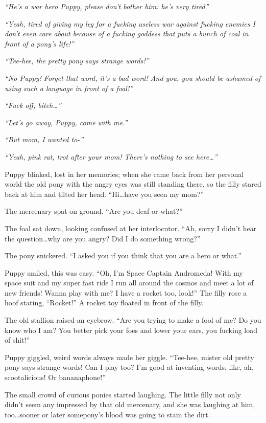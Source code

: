 \emph{``He's a war hero Puppy, please don't bother him: he's very tired''}

\emph{``Yeah, tired of giving my leg for a fucking useless war against fucking enemies I don't even care about because of a fucking goddess that puts a bunch of coal in front of a pony's life!''}

\emph{``Tee-hee, the pretty pony says strange words!''}

\emph{``No Puppy! Forget that word, it's a bad word! And you, you should be ashamed of using such a language in front of a foal!''}

\emph{``Fuck off, bitch\dots''}

\emph{``Let's go away, Puppy, come with me.''}

\emph{``But mom, I wanted to-''}

\emph{``Yeah, pink rat, trot after your mom! There's nothing to see here\dots''}

Puppy blinked, lost in her memories; when she came back from her personal world the old pony with the angry eyes was still standing there, so the filly stared back at him and tilted her head. ``Hi\dots have you seen my mom?''

The mercenary spat on ground. ``Are you deaf or what?''

The foal sat down, looking confused at her interlocutor. ``Ah, sorry I didn't hear the question\dots why are you angry? Did I do something wrong?''

The pony snickered. ``I asked you if you think that you are a hero or what.''

Puppy smiled, this was easy. ``Oh, I'm Space Captain Andromeda! With my space suit and my super fast ride I run all around the cosmos and meet a lot of new friends! Wanna play with me? I have a rocket too, look!'' The filly rose a hoof stating, ``Rocket!'' A rocket toy floated in front of the filly.

The old stallion raised an eyebrow. ``Are you trying to make a fool of me? Do you know who I am? You better pick your foes and lower your ears, you fucking load of shit!''

Puppy giggled, weird words always made her giggle. ``Tee-hee, mister old pretty pony says strange words! Can I play too? I'm good at inventing words, like, ah, scootalicious! Or bananaphone!''

The small crowd of curious ponies started laughing. The little filly not only didn't seem any impressed by that old mercenary, and she was laughing at him, too\dots sooner or later somepony's blood was going to stain the dirt.

